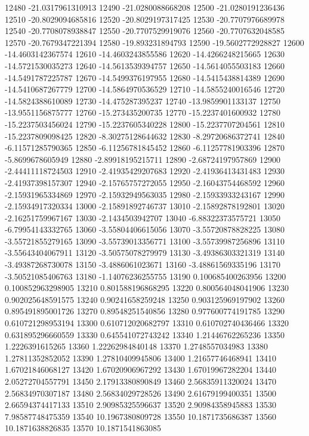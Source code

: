 {12480 -21.0317961310913
12490 -21.0280088668208
12500 -21.0280191236436
12510 -20.8029094685816
12520 -20.8029197317425
12530 -20.7707976689978
12540 -20.7708078938847
12550 -20.7707529919076
12560 -20.7707632048585
12570 -20.7679347221394
12580 -19.893231894793
12590 -19.5602772928827
12600 -14.4603142367574
12610 -14.4603243855586
12620 -14.4266248215665
12630 -14.5721530035273
12640 -14.5613539394757
12650 -14.5614055503183
12660 -14.5491787225787
12670 -14.5499376197955
12680 -14.5415438814389
12690 -14.5410687267779
12700 -14.5864970536529
12710 -14.5855240016546
12720 -14.5824388610089
12730 -14.475287395237
12740 -13.9859901133137
12750 -13.9551156875777
12760 -15.273435200735
12770 -15.2237401600932
12780 -15.2237503456024
12790 -15.2237605340228
12800 -15.2237707204561
12810 -15.2237809098425
12820 -8.30275128644632
12830 -8.29720686372741
12840 -6.11571285790365
12850 -6.11256781845452
12860 -6.11257781903396
12870 -5.8699678605949
12880 -2.89918195215711
12890 -2.68724197957869
12900 -2.44411118724503
12910 -2.41935429207683
12920 -2.41936413431483
12930 -2.41937398157307
12940 -2.15765757272055
12950 -2.16043754468592
12960 -2.15931965334869
12970 -2.15932949563035
12980 -2.15933933243167
12990 -2.15934917320334
13000 -2.15891892746737
13010 -2.15892878192801
13020 -2.16251759967167
13030 -2.1434503942707
13040 -6.88322373575721
13050 -6.79954143332765
13060 -3.55804406615056
13070 -3.55720878828225
13080 -3.55721855279165
13090 -3.55739013356771
13100 -3.55739987256896
13110 -3.55643404067911
13120 -3.50575078279979
13130 -3.49386303321319
13140 -3.49387268730078
13150 -3.4886061023671
13160 -3.48861569335196
13170 -3.50521085406763
13180 -1.14076236255755
13190 0.100685400263956
13200 0.100852963298905
13210 0.801588196868295
13220 0.800564048041906
13230 0.902025648591575
13240 0.90241658259248
13250 0.903125969197902
13260 0.895491895001726
13270 0.89548251540856
13280 0.977600774191785
13290 0.610721298953194
13300 0.610712020682797
13310 0.610702740436466
13320 0.631895296660559
13330 0.645541072743242
13340 1.21446762265236
13350 1.2226391615265
13360 1.22262984840148
13370 1.2748557034983
13380 1.27811352852052
13390 1.27810409945806
13400 1.21657746468941
13410 1.67021846068127
13420 1.67020906967292
13430 1.67019967282204
13440 2.05272704557791
13450 2.17913380890849
13460 2.56835911320024
13470 2.56834970307187
13480 2.56834029728526
13490 2.61679199400351
13500 2.66594374417133
13510 2.90985325596637
13520 2.90984358945883
13530 7.98587748475359
13540 10.1967380809728
13550 10.1871735686387
13560 10.1871638826835
13570 10.1871541863085
}

